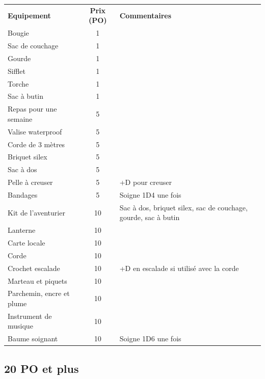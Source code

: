 \documentclass[a4paper, 11pt, twoside]{article}
\begin{document}
\begin{longtable}{lcp{10cm}}
\textbf{Equipement} & \textbf{Prix (PO)} & \textbf{Commentaires}\\
Bougie & 1 & \\
Sac de couchage & 1 & \\
Gourde & 1 & \\
Sifflet & 1 & \\
Torche & 1 & \\
Sac à butin & 1 & \\
Repas pour une semaine & 5 & \\
Valise waterproof & 5 & \\
Corde de 3 mètres & 5 & \\
Briquet silex & 5 & \\
Sac à dos & 5 & \\
Pelle à creuser & 5 & +D pour creuser\\
Bandages & 5 & Soigne 1D4 une fois\\
Kit de l'aventurier & 10 & Sac à dos, briquet silex, sac de couchage, gourde, sac à butin\\
Lanterne & 10 & \\
Carte locale & 10 & \\
Corde & 10 & \\
Crochet escalade & 10 & +D en escalade si utilisé avec la corde\\
Marteau et piquets & 10 & \\
Parchemin, encre et plume & 10 & \\
Instrument de musique & 10 & \\
Baume soignant & 10 & Soigne 1D6 une fois\\
\end{longtable}

\subsection{20 PO et plus}
\label{sec:orgcb1d3b2}
\end{document}
